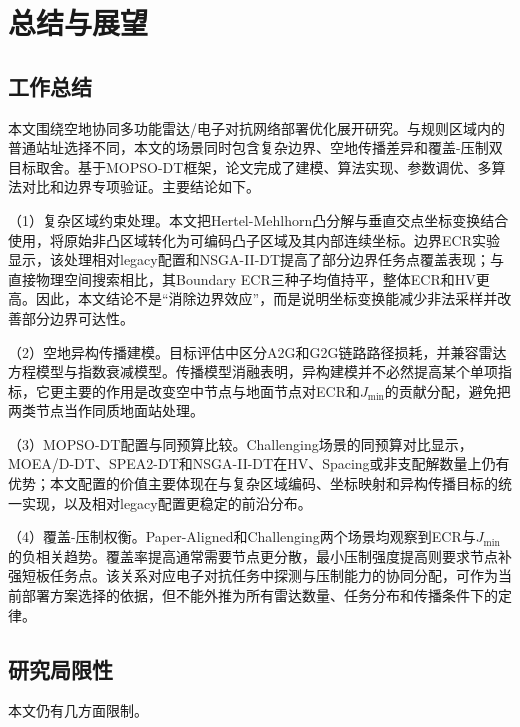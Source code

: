 \chapter{总结与展望}\label{chap:conclusion}

\section{工作总结}

本文围绕空地协同多功能雷达/电子对抗网络部署优化展开研究。与规则区域内的普通站址选择不同，本文的场景同时包含复杂边界、空地传播差异和覆盖-压制双目标取舍。基于MOPSO-DT框架，论文完成了建模、算法实现、参数调优、多算法对比和边界专项验证。主要结论如下。

（1）复杂区域约束处理。本文把Hertel-Mehlhorn凸分解与垂直交点坐标变换结合使用，将原始非凸区域转化为可编码凸子区域及其内部连续坐标。边界ECR实验显示，该处理相对legacy配置和NSGA-II-DT提高了部分边界任务点覆盖表现；与直接物理空间搜索相比，其Boundary ECR三种子均值持平，整体ECR和HV更高。因此，本文结论不是“消除边界效应”，而是说明坐标变换能减少非法采样并改善部分边界可达性。

（2）空地异构传播建模。目标评估中区分A2G和G2G链路路径损耗，并兼容雷达方程模型与指数衰减模型。传播模型消融表明，异构建模并不必然提高某个单项指标，它更主要的作用是改变空中节点与地面节点对ECR和$J_{\min}$的贡献分配，避免把两类节点当作同质地面站处理。

（3）MOPSO-DT配置与同预算比较。Challenging场景的同预算对比显示，MOEA/D-DT、SPEA2-DT和NSGA-II-DT在HV、Spacing或非支配解数量上仍有优势；本文配置的价值主要体现在与复杂区域编码、坐标映射和异构传播目标的统一实现，以及相对legacy配置更稳定的前沿分布。

（4）覆盖-压制权衡。Paper-Aligned和Challenging两个场景均观察到ECR与$J_{\min}$的负相关趋势。覆盖率提高通常需要节点更分散，最小压制强度提高则要求节点补强短板任务点。该关系对应电子对抗任务中探测与压制能力的协同分配，可作为当前部署方案选择的依据，但不能外推为所有雷达数量、任务分布和传播条件下的定律。

\section{研究局限性}

本文仍有几方面限制。

